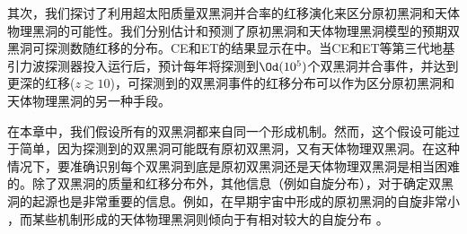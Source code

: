 其次，我们探讨了利用超太阳质量双黑洞并合率的红移演化来区分原初黑洞和天体物理黑洞的可能性。我们分别估计和预测了原初黑洞和天体物理黑洞模型的预期双黑洞可探测数随红移的分布。CE和ET的结果显示在中。当CE和ET等第三代地基引力波探测器投入运行后，预计每年将探测到$\Od(10^5)$个双黑洞并合事件，并达到更深的红移($z \gtrsim 10$)，可探测到的双黑洞事件的红移分布可以作为区分原初黑洞和天体物理黑洞的另一种手段。

在本章中，我们假设所有的双黑洞都来自同一个形成机制。然而，这个假设可能过于简单，因为\lvc 探测到的双黑洞可能既有原初双黑洞，又有天体物理双黑洞。在这种情况下，要准确识别每个双黑洞到底是原初双黑洞还是天体物理双黑洞是相当困难的。除了双黑洞的质量和红移分布外，其他信息（例如自旋分布），对于确定双黑洞的起源也是非常重要的信息。例如，在早期宇宙中形成的原初黑洞的自旋非常小\cite{Chiba:2017rvs,Mirbabayi:2019uph,DeLuca:2019buf} ，而某些机制形成的天体物理黑洞则倾向于有相对较大的自旋分布 \cite{Kinugawa:2016ect}。